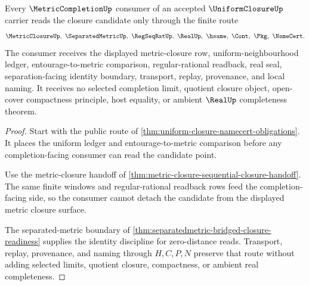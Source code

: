 \begin{theorem}
\label{thm:uniform-closure-completion-handoff}
Every $\MetricCompletionUp$ consumer of an accepted $\UniformClosureUp$ carrier reads the closure candidate only through the finite route
$$
\MetricClosureUp,\ \SeparatedMetricUp,\ \RegSeqRatUp,\ \RealUp,\ \hsame,\ \Cont,\ \Pkg,\ \NameCert .
$$
The consumer receives the displayed metric-closure row, uniform-neighbourhood ledger, entourage-to-metric comparison, regular-rational readback, real seal, separation-facing identity boundary, transport, replay, provenance, and local naming. It receives no selected completion limit, quotient closure object, open-cover compactness principle, host equality, or ambient $\RealUp$ completeness theorem.
\end{theorem}
\begin{proof}
Start with the public route of \autoref{thm:uniform-closure-namecert-obligations}. It places the uniform ledger and entourage-to-metric comparison before any completion-facing consumer can read the candidate point.

Use the metric-closure handoff of \autoref{thm:metric-closure-sequential-closure-handoff}. The same finite windows and regular-rational readback rows feed the completion-facing side, so the consumer cannot detach the candidate from the displayed metric closure surface.

The separated-metric boundary of \autoref{thm:separatedmetric-bridged-closure-readiness} supplies the identity discipline for zero-distance reads. Transport, replay, provenance, and naming through $H,C,P,N$ preserve that route without adding selected limits, quotient closure, compactness, or ambient real completeness.
\end{proof}

